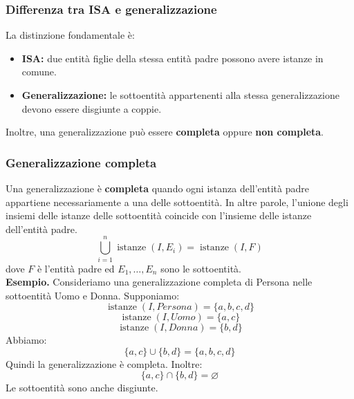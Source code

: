 \subsubsection*{Differenza tra ISA e generalizzazione}
La distinzione fondamentale è:
\begin{itemize}
    \item \textbf{ISA:} due entità figlie della stessa
    entità padre possono avere istanze in comune.

    \item \textbf{Generalizzazione:} le sottoentità
    appartenenti alla stessa generalizzazione
    devono essere disgiunte a coppie.
\end{itemize}
\noindent
Inoltre, una generalizzazione può essere
\textbf{completa} oppure \textbf{non completa}.

\subsubsection*{Generalizzazione completa}
Una generalizzazione è \textbf{completa}
quando ogni istanza dell'entità padre appartiene
necessariamente a una delle sottoentità.
In altre parole, l'unione degli insiemi delle istanze
delle sottoentità coincide con l'insieme delle istanze
dell'entità padre.
\[
\boxed{
\bigcup_{i=1}^{n}
\operatorname{istanze}(I,E_i)
=
\operatorname{istanze}(I,F)
}
\]
dove $F$ è l'entità padre ed $E_1,\ldots,E_n$
sono le sottoentità.\\
\textcolor{verdeEsempio}{\textbf{Esempio.}}
Consideriamo una generalizzazione completa
di Persona nelle sottoentità Uomo e Donna.
Supponiamo:
\[
\operatorname{istanze}(I,Persona)=\{a,b,c,d\}
\]
\[
\operatorname{istanze}(I,Uomo)=\{a,c\}
\]
\[
\operatorname{istanze}(I,Donna)=\{b,d\}
\]
Abbiamo:
\[
\{a,c\}\cup\{b,d\}=\{a,b,c,d\}
\]
Quindi la generalizzazione è completa.
Inoltre:
\[
\{a,c\}\cap\{b,d\}=\varnothing
\]
Le sottoentità sono anche disgiunte.
